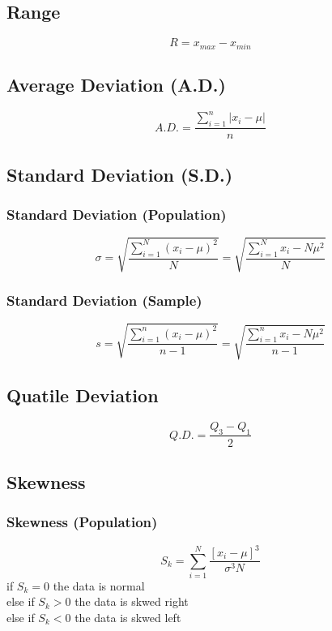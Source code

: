 \documentclass[twocolumn]{article}
\begin{document}
    \subsection{Range}
    \begin{equation}
        R = x_{max} - x_{min}
    \end{equation}
    \subsection{Average Deviation (A.D.)}
    \begin{equation}
        A.D. = \frac{\sum_{i=1}^{n} |x_{i}-\mu|}{n}
    \end{equation}
    \subsection{Standard Deviation (S.D.)}
    \subsubsection{Standard Deviation (Population)}
    \begin{equation}
        \sigma = \sqrt{\frac{\sum_{i=1}^{N} (x_{i}-\mu)^2}{N}} = \sqrt{\frac{\sum_{i=1}^{N} x_{i} -N\mu^2}{N}}
    \end{equation}
    \subsubsection{Standard Deviation (Sample)}
    \begin{equation}
        s = \sqrt{\frac{\sum_{i=1}^{n} (x_{i}-\mu)^2}{n-1}} = \sqrt{\frac{\sum_{i=1}^{n} x_{i} -N\mu^2}{n-1}}
    \end{equation}
    \subsection{Quatile Deviation}
    \begin{equation}
        Q.D. = \frac{Q_{3} - Q_{1}}{2}
    \end{equation}

    \newpage

    \subsection{Skewness}
    \subsubsection{Skewness (Population)}
    \begin{equation}
        S_{k} = \sum_{i=1}^{N}\frac{[x_{i} - \mu]^{3}}{\sigma^{3}N}
    \end{equation}
    if $S_{k} = 0$ the data is normal\\
    else if $S_{k} > 0$ the data is skwed right\\
    else if $S_{k} < 0$ the data is skwed left
\end{document}
